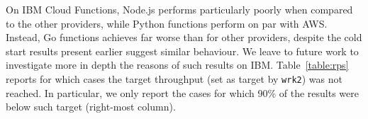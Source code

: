 On \gls{IBM} Cloud Functions, Node.js performs particularly poorly when compared to the other providers, while Python functions perform on par with \gls{AWS}.
Instead, Go functions achieves far worse than for other providers, despite the cold start results present earlier suggest similar behaviour. 
We leave to future work to investigate more in depth the reasons of such results on \gls{IBM}.
 
Table~\ref{table:rps} reports for which cases the target throughput (set as target by \texttt{wrk2}) was not reached. 
In particular, we only report the cases for which 90\% of the results were below such target (right-most column).

